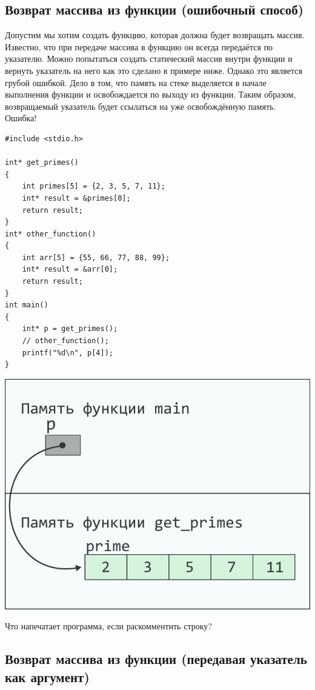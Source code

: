 \documentclass{article}
\begin{document}
\newpage

\subsection*{Возврат массива из функции (ошибочный способ)}
Допустим мы хотим создать функцию, которая должна будет возвращать массив.
Известно, что при передаче массива в функцию он всегда передаётся по указателю.
Можно попытаться создать статический массив внутри функции и вернуть указатель на него как
это сделано в примере ниже.
Однако это является грубой ошибкой. Дело в том, что память на стеке
выделяется в начале выполнения функции и освобождается по выходу из функции.
Таким образом, возвращаемый указатель будет ссылаться на уже освобождённую память. Ошибка!
\begin{multicols}{2}
\begin{lstlisting}
#include <stdio.h>

int* get_primes()
{
	int primes[5] = {2, 3, 5, 7, 11};
	int* result = &primes[0];
	return result;
}
int* other_function()
{
	int arr[5] = {55, 66, 77, 88, 99};
	int* result = &arr[0];
	return result;
}
int main()
{
	int* p = get_primes();
	// other_function();
	printf("%d\n", p[4]);
}
\end{lstlisting}
\columnbreak
\begin{center}
\includegraphics[scale=1]{../images/pointer_schemes/function_return_stack_array.png}
\end{center}
\end{multicols}
Что напечатает программа, если раскомментить строку?

\subsection*{Возврат массива из функции (передавая указатель как аргумент)}
\end{document}

